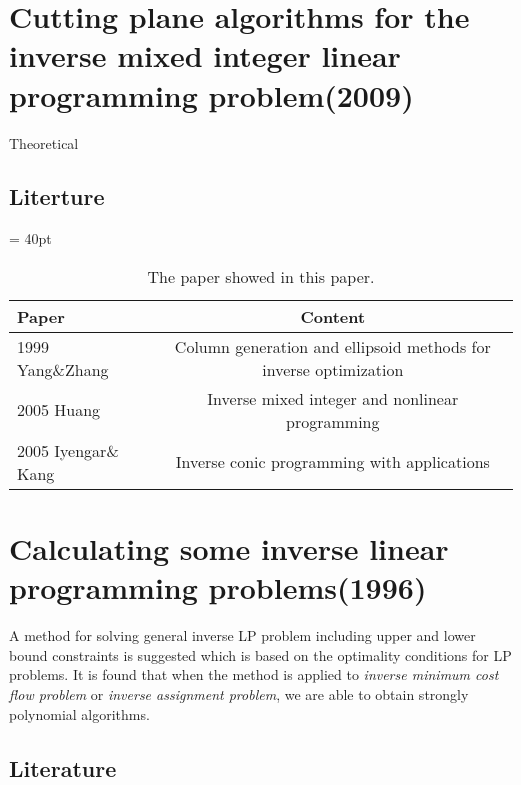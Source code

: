\documentclass[UTF8]{article}
\begin{document}
\section{Cutting plane algorithms for the inverse mixed integer linear programming problem(2009)}

Theoretical


\subsection{Literture}


\begin{table}[ht]
 
 \tabcolsep = 40pt
 
 \small\renewcommand{}
 
 \caption{The paper showed in this paper.\label{tab:8}}
 
 {\begin{tabular}{lc}
   \hline
   Paper               & Content                                                          \\
   \hline
   1999 Yang\&Zhang    & Column generation and ellipsoid methods for inverse optimization \\
   \hline
   2005 Huang          & Inverse mixed integer and nonlinear programming                  \\
   \hline
   2005 Iyengar\& Kang & Inverse conic programming with applications                      \\
   \hline
  \end{tabular}}
 {}
\end{table}


\section{Calculating some inverse linear programming problems(1996)}

A method for solving general inverse LP problem including upper and lower bound constraints is suggested which is based on the optimality conditions for LP problems. It is found that when the method is applied to \emph{inverse minimum cost flow problem} or \emph{inverse assignment problem}, we are able to obtain strongly polynomial algorithms.


\subsection{Literature}
\end{document}
